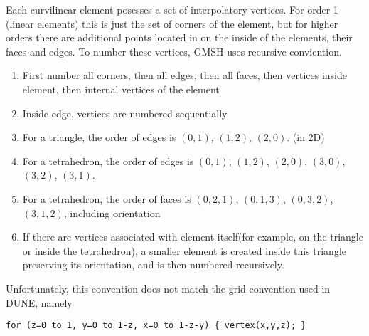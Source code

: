 \noindent
Each curvilinear element posesses a set of interpolatory vertices. For order 1 (linear elements) this is just the set of corners of the element, but for higher orders there are additional points located in on the inside of the elements, their faces and edges. To number these vertices, GMSH uses recursive conviention.

\begin{enumerate}
	\item First number all corners, then all edges, then all faces, then vertices inside element, then internal vertices of the element
	\item Inside edge, vertices are numbered sequentially
	\item For a triangle, the order of edges is $(0,1)$, $(1,2)$, $(2,0)$. (in 2D)
	\item For a tetrahedron, the order of edges is $(0,1)$, $(1,2)$, $(2,0)$, $(3,0)$, $(3,2)$, $(3,1)$.
	\item For a tetrahedron, the order of faces is $(0, 2, 1)$, $(0, 1, 3)$, $(0, 3, 2)$, $(3, 1, 2)$, including orientation
	\item If there are vertices associated with element itself(for example, on the triangle or inside the tetrahedron), a smaller element is created inside this triangle preserving its orientation, and is then numbered recursively.
\end{enumerate}

\noindent
Unfortunately, this convention does not match the grid convention used in DUNE, namely
\begin{mybox}
\begin{lstlisting}
for (z=0 to 1, y=0 to 1-z, x=0 to 1-z-y) { vertex(x,y,z); }
\end{lstlisting}
\end{mybox}

